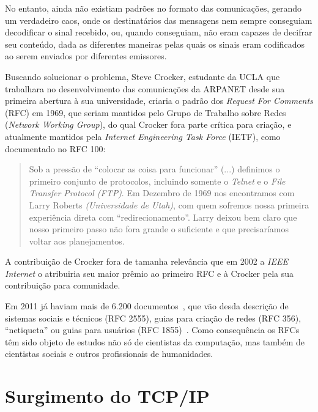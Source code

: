 \documentclass[conference]{IEEEtran}
\begin{document}
  No entanto, ainda não existiam padrões no formato das
  comunicações, gerando um verdadeiro caos, onde os destinatários das mensagens nem sempre conseguiam decodificar o sinal recebido, ou, quando conseguiam, não eram capazes de decifrar seu conteúdo, dada as diferentes maneiras pelas quais os sinais eram codificados ao serem enviados por diferentes emissores.%

  Buscando solucionar o problema, Steve Crocker, estudante da UCLA que trabalhara no desenvolvimento das comunicações da ARPANET desde sua primeira abertura à sua universidade, criaria o padrão dos \emph{Request For Comments}
  (RFC) em 1969, que seriam mantidos pelo Grupo de Trabalho sobre Redes
  (\emph{Network Working Group}), do qual Crocker fora parte crítica para
  criação, e atualmente mantidos pela \emph{Internet Engineering Task Force} (IETF), como documentado no RFC 100:

  \begin{quote}

    Sob a pressão de ``colocar as coisa para funcionar'' (...) definimos o
    primeiro conjunto de protocolos, incluindo somente o \emph{Telnet} e o
    \emph{File Transfer Protocol (FTP)}. Em Dezembro de 1969 nos encontramos com
    Larry Roberts \emph{(Universidade de Utah)}, com quem sofremos nossa
    primeira experiência direta com ``redirecionamento''.
    Larry deixou bem claro que nosso primeiro passo não fora grande o
    suficiente e que precisaríamos voltar aos planejamentos.~\cite{rfc100}
    
  \end{quote}
  
  A contribuição de Crocker fora de tamanha relevância que em 2002 a \emph{IEEE Internet} o atribuiria seu maior prêmio ao primeiro RFC e à Crocker pela sua contribuição para comunidade.

  Em 2011 já haviam mais de 6.200 documentos~\cite{framingyears}, que vão desda
  descrição de sistemas sociais e técnicos (RFC 2555), guias para criação de
  redes (RFC 356), ``netiqueta'' ou guias para usuários
  (RFC 1855)~\cite{framingyears}. Como
  consequência os RFCs têm sido objeto de estudos não só de cientistas da
  computação, mas também de cientistas sociais e outros profissionais de
  humanidades.

  \section{Surgimento do TCP/IP}
	
\end{document}
